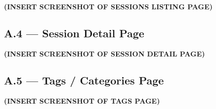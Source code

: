 \documentclass[11pt,a4paper]{article}
\begin{document}
\textbf{(INSERT SCREENSHOT OF SESSIONS LISTING PAGE)}

\subsection{A.4 — Session Detail Page}


\textbf{(INSERT SCREENSHOT OF SESSION DETAIL PAGE)}

\subsection{A.5 — Tags / Categories Page}


\textbf{(INSERT SCREENSHOT OF TAGS PAGE)}
\end{document}
